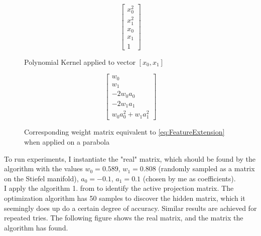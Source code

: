 \def\PHI{
\begin{bmatrix}
	x_0^2 \\
	x_1^2 \\
	x_0 \\
	x_1 \\
    1
\end{bmatrix}}


\def\WtoPhi{
\begin{bmatrix}
	w_0 \\
    w_1 \\
	-2 w_0 a_0 \\
	-2 w_1 a_1 \\
	w_0 a_0^2 + w_1 a_1^2
\end{bmatrix}}

\begin{figure}[h]

\begin {minipage}{0.47\textwidth}
  \centering
  \begin{equation}
    \PHI
  \end{equation}
  \caption{Polynomial Kernel applied to vector $[x_0, x_1]$}
\end{minipage}
\hfill
\begin {minipage}{0.47\textwidth}
  \centering
  \begin{equation}
    \WtoPhi
  \end{equation}
  \caption{Corresponding weight matrix equivalent to \ref{eq:FeatureExtension} when applied on a parabola}
\end{minipage}

\end{figure}

To run experiments, I instantiate the "real" matrix, which should be found by the algorithm with the values $w_0 = 0.589$, $w_1 = 0.808$ (randomly sampled as a matrix on the Stiefel manifold), $a_0 = -0.1$, $a_1 = 0.1$ (chosen by me as coefficients). \\

I apply the algorithm 1. from \citep{Tripathy} to identify the active projection matrix.
The optimization algorithm has 50 samples to discover the hidden matrix, which it seemingly does up do a certain degree of accuracy.
Similar results are achieved for repeated tries.
The following figure shows the real matrix, and the matrix the algorithm has found.

\def\realW{
\begin{bmatrix}
	0.589 \\
    0.808 \\
	0.118 \\
	-0.162 \\
	0.823
\end{bmatrix}}

